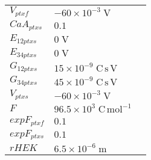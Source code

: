 \documentclass[a4paper,10.0pt]{article}
\begin{document}
{\begin{longtabu}{| l l l |}
  $V_{ptxf}$\hspace{0.5cm} & $-60\!\times\!10 ^{-3}\;\mathrm{V}$\hspace{0.5cm} & \hspace{0.5cm}\\
  $CaA_{ptxs}$\hspace{0.5cm} & $0.1$\hspace{0.5cm} & \hspace{0.5cm}\\
  $E_{12 ptxs}$\hspace{0.5cm} & $0\;\mathrm{V}$\hspace{0.5cm} & \hspace{0.5cm}\\
  $E_{34 ptxs}$\hspace{0.5cm} & $0\;\mathrm{V}$\hspace{0.5cm} & \hspace{0.5cm}\\
  $G_{12 ptxs}$\hspace{0.5cm} & $15\!\times\!10 ^{-9}\;\mathrm{C}\,\mathrm{s}\,\mathrm{V}$\hspace{0.5cm} & \hspace{0.5cm}\\
  $G_{34 ptxs}$\hspace{0.5cm} & $45\!\times\!10 ^{-9}\;\mathrm{C}\,\mathrm{s}\,\mathrm{V}$\hspace{0.5cm} & \hspace{0.5cm}\\
  $V_{ptxs}$\hspace{0.5cm} & $-60\!\times\!10 ^{-3}\;\mathrm{V}$\hspace{0.5cm} & \hspace{0.5cm}\\
  $F$\hspace{0.5cm} & $96.5\!\times\!10 ^{3}\;\mathrm{C}\,\mathrm{mol}^{-1}$\hspace{0.5cm} & \hspace{0.5cm}\\
  $expF_{ptxf}$\hspace{0.5cm} & $0.1$\hspace{0.5cm} & \hspace{0.5cm}\\
  $expF_{ptxs}$\hspace{0.5cm} & $0.1$\hspace{0.5cm} & \hspace{0.5cm}\\
  $rHEK$\hspace{0.5cm} & $6.5\!\times\!10 ^{-6}\;\mathrm{m}$\hspace{0.5cm} & \hspace{0.5cm}\\

\end{longtabu}}
\end{document}
